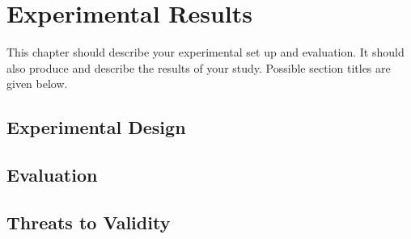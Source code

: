 \chapter{Experimental Results} 
\label{ch:experiments}

This chapter should describe your experimental set up and evaluation. It should also produce and describe the results of your study. Possible section titles are given below.

\section{Experimental Design}

\section{Evaluation}

\section{Threats to Validity}